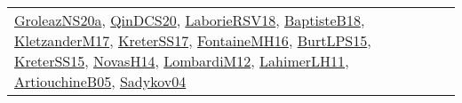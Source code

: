 {\begin{longtable}{lp{3cm}>{\raggedright}p{6cm}>{\raggedright}p{6cm}p{8cm}}
\href{papers/GroleazNS20a.pdf}{GroleazNS20a}\cite{GroleazNS20a}, \href{articles/QinDCS20.pdf}{QinDCS20}\cite{QinDCS20}, \href{articles/LaborieRSV18.pdf}{LaborieRSV18}\cite{LaborieRSV18}, \href{articles/BaptisteB18.pdf}{BaptisteB18}\cite{BaptisteB18}, \href{papers/KletzanderM17.pdf}{KletzanderM17}\cite{KletzanderM17}, \href{articles/KreterSS17.pdf}{KreterSS17}\cite{KreterSS17}, \href{papers/FontaineMH16.pdf}{FontaineMH16}\cite{FontaineMH16}, \href{papers/BurtLPS15.pdf}{BurtLPS15}\cite{BurtLPS15}, \href{papers/KreterSS15.pdf}{KreterSS15}\cite{KreterSS15}, \href{articles/NovasH14.pdf}{NovasH14}\cite{NovasH14}, \href{articles/LombardiM12.pdf}{LombardiM12}\cite{LombardiM12}, \href{papers/LahimerLH11.pdf}{LahimerLH11}\cite{LahimerLH11}, \href{papers/ArtiouchineB05.pdf}{ArtiouchineB05}\cite{ArtiouchineB05}, \href{papers/Sadykov04.pdf}{Sadykov04}\cite{Sadykov04}\\

\end{longtable}}
